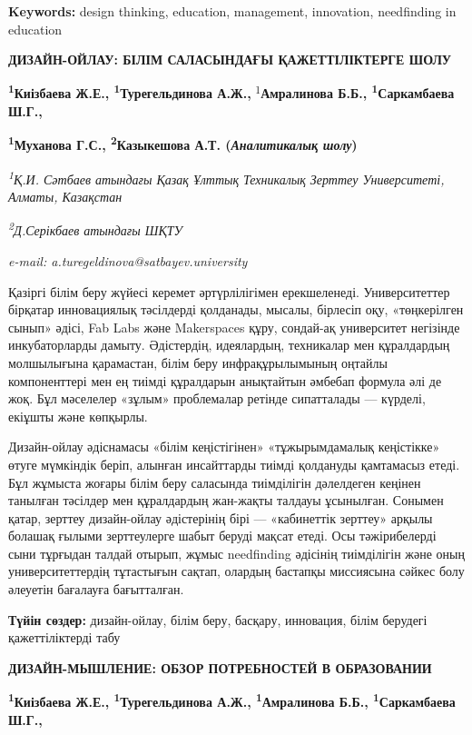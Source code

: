 {\bfseries Keywords:} design thinking, education, management, innovation,
needfinding in education

{\bfseries ДИЗАЙН-ОЙЛАУ: БІЛІМ САЛАСЫНДАҒЫ ҚАЖЕТТІЛІКТЕРГЕ ШОЛУ}

{\bfseries \textsuperscript{1}Киізбаева Ж.Е.,
\textsuperscript{1}Турегельдинова А.Ж.\textsuperscript{\envelope },}
\textsuperscript{1}{\bfseries Амралинова Б.Б.,
\textsuperscript{1}Саркамбаева Ш.Г.,}

{\bfseries \textsuperscript{1}Муханова Г.С., \textsuperscript{2}Казыкешова
А.Т. (\emph{Аналитикалық шолу})}

\emph{\textsuperscript{1}Қ.И. Сәтбаев атындағы Қазақ Ұлттық Техникалық
Зерттеу Университеті, Алматы, Казақстан}

\emph{\textsuperscript{2}Д.Серікбаев атындағы ШҚТУ}

\emph{e-mail: a.turegeldinova@satbayev.university}

Қазіргі білім беру жүйесі керемет әртүрлілігімен ерекшеленеді.
Университеттер бірқатар инновациялық тәсілдерді қолданады, мысалы,
бірлесіп оқу, «төңкерілген сынып» әдісі, Fab Labs және Makerspaces құру,
сондай-ақ университет негізінде инкубаторларды дамыту. Әдістердің,
идеялардың, техникалар мен құралдардың молшылығына қарамастан, білім
беру инфрақұрылымының оңтайлы компоненттері мен ең тиімді құралдарын
анықтайтын әмбебап формула әлі де жоқ. Бұл мәселелер «зұлым» проблемалар
ретінде сипатталады --- күрделі, екіұшты және көпқырлы.

Дизайн-ойлау әдіснамасы «білім кеңістігінен» «тұжырымдамалық кеңістікке»
өтуге мүмкіндік беріп, алынған инсайттарды тиімді қолдануды қамтамасыз
етеді. Бұл жұмыста жоғары білім беру саласында тиімділігін дәлелдеген
кеңінен танылған тәсілдер мен құралдардың жан-жақты талдауы ұсынылған.
Сонымен қатар, зерттеу дизайн-ойлау әдістерінің бірі --- «кабинеттік
зерттеу» арқылы болашақ ғылыми зерттеулерге шабыт беруді мақсат етеді.
Осы тәжірибелерді сыни тұрғыдан талдай отырып, жұмыс needfinding
әдісінің тиімділігін және оның университеттердің тұтастығын сақтап,
олардың бастапқы миссиясына сәйкес болу әлеуетін бағалауға бағытталған.

{\bfseries Түйін сөздер:} дизайн-ойлау, білім беру, басқару, инновация,
білім берудегі қажеттіліктерді табу

{\bfseries ДИЗАЙН-МЫШЛЕНИЕ: ОБЗОР ПОТРЕБНОСТЕЙ В ОБРАЗОВАНИИ}

{\bfseries \textsuperscript{1}Киізбаева Ж.Е.,
\textsuperscript{1}Турегельдинова А.Ж\textsuperscript{\envelope }.,
\textsuperscript{1}Амралинова Б.Б., \textsuperscript{1}Саркамбаева
Ш.Г.,}

